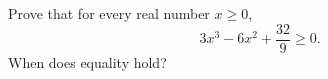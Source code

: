 Prove that for every real number $x\ge0$,
\[
3x^3-6x^2+\dfrac{32}{9}\ge0 .
\]
When does equality hold?

